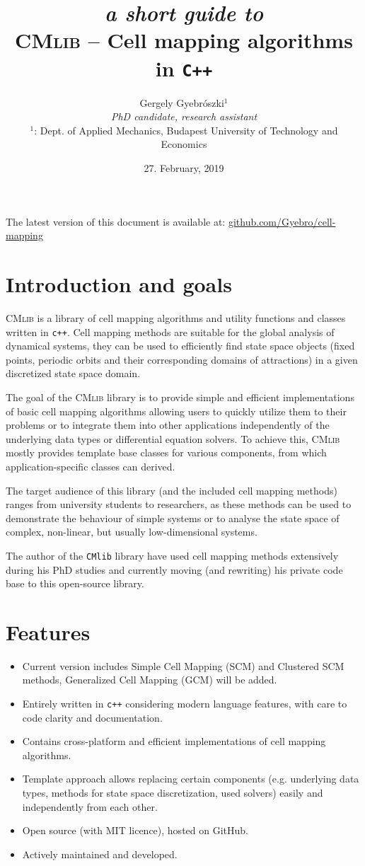 \documentclass[11pt]{article}
\title{{\small \emph{a short guide to}\\}
\textsc{CMlib} -- Cell mapping algorithms in \texttt{C++}}
\author{Gergely Gyebrószki$^1$ \\
\emph{PhD candidate, research assistant} \\
$^1$: Dept. of Applied Mechanics, Budapest University of Technology and Economics
}
\date{27. February, 2019}
\begin{document}
\maketitle

{\small The latest version of this document is available at: \href{https://github.com/Gyebro/cell-mapping/blob/master/docs/tex/cell-mapping-cpp.pdf}{github.com/Gyebro/cell-mapping}}
	
\section{Introduction and goals}

\textsc{CMlib} is a library of cell mapping algorithms and utility functions and classes written in \texttt{c++}. 
Cell mapping methods are suitable for the global analysis of dynamical systems, they can be used to efficiently find state space objects (fixed points, periodic orbits and their corresponding domains of attractions) in a given discretized state space domain. 

The goal of the \textsc{CMlib} library is to provide simple and efficient implementations of basic cell mapping algorithms allowing users to quickly utilize them to their problems or to integrate them into other applications independently of the underlying data types or differential equation solvers. To achieve this, \textsc{CMlib} mostly provides template base classes for various components, from which application-specific classes can derived.

The target audience of this library (and the included cell mapping  methods) ranges from university students to researchers, as these methods can be used to demonstrate the behaviour of simple systems or to analyse the state space of complex, non-linear, but usually low-dimensional systems. 

The author of the \texttt{CMlib} library have used cell mapping methods extensively during his PhD studies and currently moving (and rewriting) his private code base to this open-source library.

\section{Features}

\begin{itemize}
	\item Current version includes Simple Cell Mapping (SCM) and Clustered SCM methods, Generalized Cell Mapping (GCM) will be added.
	\item Entirely written in \texttt{c++} considering modern language features, with care to code clarity and documentation.
	\item Contains cross-platform and efficient implementations of cell mapping algorithms.
	\item Template approach allows replacing certain components (e.g. underlying data types, methods for state space discretization, used solvers) easily and independently from each other.
	\item Open source (with MIT licence), hosted on GitHub.
	\item Actively maintained and developed.
\end{itemize}
\end{document}
